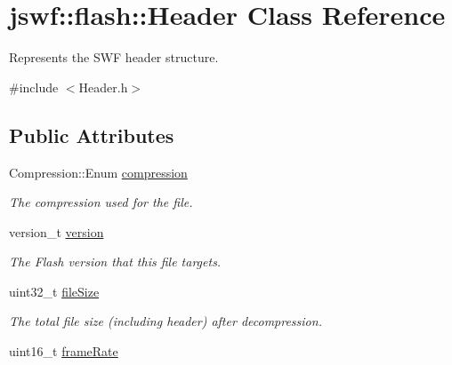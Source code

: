 \hypertarget{classjswf_1_1flash_1_1_header}{\section{jswf\+:\+:flash\+:\+:Header Class Reference}
\label{classjswf_1_1flash_1_1_header}
}


Represents the {\ttfamily S\+W\+F header} structure.  




{\ttfamily \#include $<$Header.\+h$>$}

\subsection*{Public Attributes}
\begin{DoxyCompactItemize}
\item 
\hypertarget{classjswf_1_1flash_1_1_header_aeeec53edb1da8f04f91c0dfc999ce02b}{Compression\+::\+Enum \hyperlink{classjswf_1_1flash_1_1_header_aeeec53edb1da8f04f91c0dfc999ce02b}{compression}}\label{classjswf_1_1flash_1_1_header_aeeec53edb1da8f04f91c0dfc999ce02b}

\begin{DoxyCompactList}\small\item\em The compression used for the file. \end{DoxyCompactList}\item 
\hypertarget{classjswf_1_1flash_1_1_header_afee43d7f58d6e6f9274fd238bf33619e}{version\+\_\+t \hyperlink{classjswf_1_1flash_1_1_header_afee43d7f58d6e6f9274fd238bf33619e}{version}}\label{classjswf_1_1flash_1_1_header_afee43d7f58d6e6f9274fd238bf33619e}

\begin{DoxyCompactList}\small\item\em The Flash version that this file targets. \end{DoxyCompactList}\item 
\hypertarget{classjswf_1_1flash_1_1_header_a6886af043400e1d2a5300e7110e88de0}{uint32\+\_\+t \hyperlink{classjswf_1_1flash_1_1_header_a6886af043400e1d2a5300e7110e88de0}{file\+Size}}\label{classjswf_1_1flash_1_1_header_a6886af043400e1d2a5300e7110e88de0}

\begin{DoxyCompactList}\small\item\em The total file size (including header) after decompression. \end{DoxyCompactList}\item 
\hypertarget{classjswf_1_1flash_1_1_header_a2d609e0a85bd0eef4a2b79e7cd793789}{uint16\+\_\+t \hyperlink{classjswf_1_1flash_1_1_header_a2d609e0a85bd0eef4a2b79e7cd793789}{frame\+Rate}}\label{classjswf_1_1flash_1_1_header_a2d609e0a85bd0eef4a2b79e7cd793789}


\end{DoxyCompactItemize}
